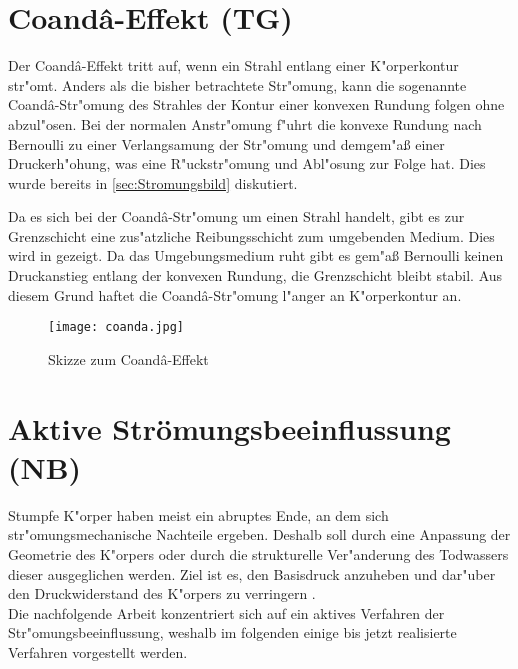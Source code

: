 \section{Coand\^{a}-Effekt (TG)}

Der Coand\^{a}-Effekt tritt auf, wenn ein Strahl entlang einer K"orperkontur str"omt. Anders als die bisher betrachtete Str"omung, kann die sogenannte Coand\^{a}-Str"omung des Strahles der Kontur einer konvexen Rundung folgen ohne abzul"osen. Bei der normalen Anstr"omung f"uhrt die konvexe Rundung nach Bernoulli zu einer Verlangsamung der Str"omung und demgem"a\ss{} einer Druckerh"ohung, was eine R"uckstr"omung und Abl"osung zur Folge hat. Dies wurde bereits in \ref{sec:Stromungsbild} diskutiert.

Da es sich bei der Coand\^{a}-Str"omung um einen Strahl handelt, gibt es zur Grenzschicht eine zus"atzliche Reibungsschicht zum umgebenden Medium. Dies wird in  gezeigt. Da das Umgebungsmedium ruht gibt es gem"a\ss{} Bernoulli keinen Druckanstieg entlang der konvexen Rundung, die Grenzschicht bleibt stabil. Aus diesem Grund haftet die Coand\^{a}-Str"omung l"anger an K"orperkontur an.

\begin{figure}[h]
	\centering
	\texttt{[image: coanda.jpg]}
	\caption{Skizze zum Coand\^{a}-Effekt \cite{Stadlberger.2016}}
	\label{fig:coanda}
\end{figure}




\newpage
\section{Aktive Str\"omungsbeeinflussung (NB)}

Stumpfe K"orper haben meist ein abruptes Ende, an dem sich str"omungsmechanische Nachteile ergeben. Deshalb soll durch eine Anpassung der Geometrie des K"orpers oder durch die strukturelle Ver"anderung des Todwassers dieser ausgeglichen werden. Ziel ist es, den Basisdruck anzuheben und dar"uber den Druckwiderstand des K"orpers zu verringern \cite{Hucho.2011}.\\
Die nachfolgende Arbeit konzentriert sich auf ein aktives Verfahren der Str"omungsbeeinflussung, weshalb im folgenden einige bis jetzt realisierte Verfahren vorgestellt werden.\\

